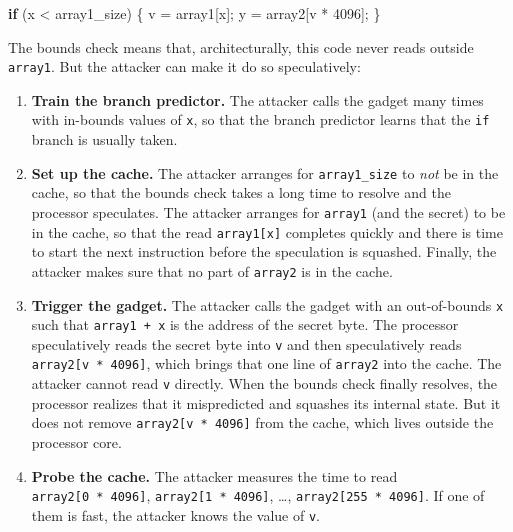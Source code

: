 \documentclass[
  letterpaper,
]{scrbook}
\newenvironment{Shaded}{\begin{snugshade}}{\end{snugshade}}
\newcommand{\ControlFlowTok}[1]{\textcolor[rgb]{0.00,0.23,0.31}{\textbf{#1}}}
\newcommand{\DecValTok}[1]{\textcolor[rgb]{0.68,0.00,0.00}{#1}}
\newcommand{\NormalTok}[1]{\textcolor[rgb]{0.00,0.23,0.31}{#1}}
\newcommand{\OperatorTok}[1]{\textcolor[rgb]{0.37,0.37,0.37}{#1}}
\theoremstyle{definition}
\theoremstyle{plain}
\theoremstyle{plain}
\theoremstyle{remark}
\begin{document}
\begin{Shaded}
\begin{Highlighting}[]
\ControlFlowTok{if} \OperatorTok{(}\NormalTok{x }\OperatorTok{\textless{}}\NormalTok{ array1\_size}\OperatorTok{)} \OperatorTok{\{}
\NormalTok{    v }\OperatorTok{=}\NormalTok{ array1}\OperatorTok{[}\NormalTok{x}\OperatorTok{];}
\NormalTok{    y }\OperatorTok{=}\NormalTok{ array2}\OperatorTok{[}\NormalTok{v }\OperatorTok{*} \DecValTok{4096}\OperatorTok{];}
\OperatorTok{\}}
\end{Highlighting}
\end{Shaded}

{} The bounds check means that,
architecturally, this code never reads outside \texttt{array1}. But the
attacker can make it do so speculatively:

\begin{enumerate}
\def\labelenumi{\arabic{enumi}.}
\item
  \textbf{Train the branch predictor.} The attacker calls the gadget
  many times with in-bounds values of \texttt{x}, so that the branch
  predictor learns that the \texttt{if} branch is usually taken.
\item
  \textbf{Set up the cache.} The attacker arranges for
  \texttt{array1\_size} to \emph{not} be in the cache, so that the
  bounds check takes a long time to resolve and the processor
  speculates. The attacker arranges for \texttt{array1} (and the secret)
  to be in the cache, so that the read \texttt{array1{[}x{]}} completes
  quickly and there is time to start the next instruction before the
  speculation is squashed. Finally, the attacker makes sure that no part
  of \texttt{array2} is in the cache.
\item
  \textbf{Trigger the gadget.} The attacker calls the gadget with an
  out-of-bounds \texttt{x} such that \texttt{array1\ +\ x} is the
  address of the secret byte. The processor speculatively reads the
  secret byte into \texttt{v} and then speculatively reads
  \texttt{array2{[}v\ *\ 4096{]}}, which brings that one line of
  \texttt{array2} into the cache. The attacker cannot read \texttt{v}
  directly. When the bounds check finally resolves, the processor
  realizes that it mispredicted and squashes its internal state. But it
  does not remove \texttt{array2{[}v\ *\ 4096{]}} from the cache, which
  lives outside the processor core.
\item
  \textbf{Probe the cache.} The attacker measures the time to read
  \texttt{array2{[}0\ *\ 4096{]}}, \texttt{array2{[}1\ *\ 4096{]}},
  \ldots, \texttt{array2{[}255\ *\ 4096{]}}. If one of them is fast, the
  attacker knows the value of \texttt{v}.
\end{enumerate}
\end{document}
